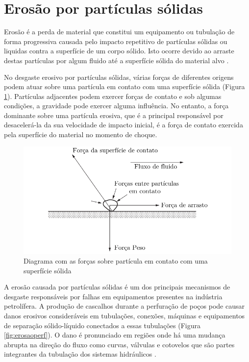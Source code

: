 \section{Erosão por partículas sólidas}
\label{cap:Erosão por partículas sólidas}


Erosão é a perda de material que constitui um equipamento ou tubulação de forma progressiva causada pelo impacto repetitivo de partículas sólidas ou liquidas contra a superfície de um corpo sólido. Isto ocorre devido ao arraste destas partículas por algum fluido até a superfície sólida do material alvo \cite{hutchings}.

No desgaste erosivo por partículas sólidas, várias forças de diferentes origens podem atuar sobre uma partícula em contato com uma superfície sólida (Figura \ref{fig:erosaoforca}). Partículas adjacentes podem exercer forças de contato e sob algumas condições, a gravidade pode exercer alguma influência. No entanto, a força dominante sobre uma partícula erosiva, que é a principal responsável por desacelerá-la da sua velocidade de impacto inicial, é a força de contato exercida pela superfície do material no momento de choque.

\begin{figure}[!h]
    \centering
    \includegraphics{Figuras/erosaoforca.pdf}
    \caption{Diagrama com as
forças sobre
partícula em contato com uma superfície sólida
}
\label{fig:erosaoforca}
\end{figure}

A erosão causada por partículas sólidas é um dos principais mecanismos de desgaste responsáveis por falhas em equipamentos presentes na indústria petrolífera. A produção de cascalhos durante a perfuração de poços pode causar danos erosivos consideráveis em tubulações, conexões, máquinas e equipamentos de separação sólido-líquido conectados a essas tubulações (Figura \ref{fig:erosaoperf}). O dano é pronunciado em regiões onde há uma mudança abrupta na direção do fluxo como curvas, válvulas e cotovelos que são partes integrantes da tubulação dos sistemas hidráulicos \cite {kumar}. 

